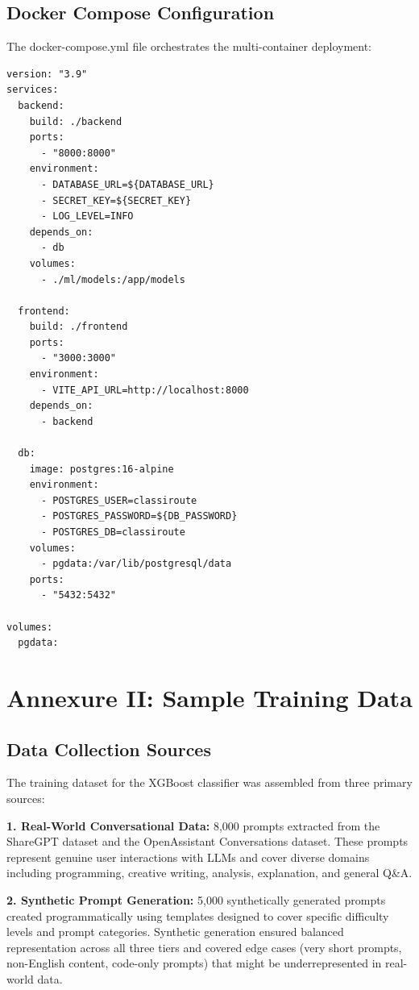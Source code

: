 \documentclass[oneside,12pt,a4paper]{report}
\begin{document}
\section{Docker Compose Configuration}

The docker-compose.yml file orchestrates the multi-container deployment:

\begin{lstlisting}[caption=Docker Compose configuration, language={},basicstyle=\ttfamily\footnotesize]
version: "3.9"
services:
  backend:
    build: ./backend
    ports:
      - "8000:8000"
    environment:
      - DATABASE_URL=${DATABASE_URL}
      - SECRET_KEY=${SECRET_KEY}
      - LOG_LEVEL=INFO
    depends_on:
      - db
    volumes:
      - ./ml/models:/app/models

  frontend:
    build: ./frontend
    ports:
      - "3000:3000"
    environment:
      - VITE_API_URL=http://localhost:8000
    depends_on:
      - backend

  db:
    image: postgres:16-alpine
    environment:
      - POSTGRES_USER=classiroute
      - POSTGRES_PASSWORD=${DB_PASSWORD}
      - POSTGRES_DB=classiroute
    volumes:
      - pgdata:/var/lib/postgresql/data
    ports:
      - "5432:5432"

volumes:
  pgdata:
\end{lstlisting}

\chapter{Annexure II: Sample Training Data}

\section{Data Collection Sources}

The training dataset for the XGBoost classifier was assembled from three primary sources:

\textbf{1. Real-World Conversational Data:} 8,000 prompts extracted from the ShareGPT dataset and the OpenAssistant Conversations dataset. These prompts represent genuine user interactions with LLMs and cover diverse domains including programming, creative writing, analysis, explanation, and general Q\&A.

\textbf{2. Synthetic Prompt Generation:} 5,000 synthetically generated prompts created programmatically using templates designed to cover specific difficulty levels and prompt categories. Synthetic generation ensured balanced representation across all three tiers and covered edge cases (very short prompts, non-English content, code-only prompts) that might be underrepresented in real-world data.
\end{document}
